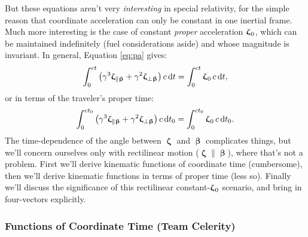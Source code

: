 \documentclass[12pt]{article}
\newcommand{\dd}[1]{\mathrm{d}#1}
\newcommand{\vvbeta}{\bm{\upbeta}}
\newcommand{\vvzeta}{\bm{\upzeta}}
\begin{document}
But these equations aren't very \emph{interesting} in special relativity, for the simple reason that coordinate acceleration can only be constant in one inertial frame. Much more interesting is the case of constant \emph{proper} acceleration $\vvzeta_{\mkern1mu 0}$, which can be maintained indefinitely (fuel considerations aside) and whose magnitude is invariant. In general, Equation \ref{eq:pa} gives:
\begin{equation*}
\int_0^{ct} \left( \gamma^3 \vvzeta_{\parallel \vvbeta} + \gamma^2 \vvzeta_{\perp \vvbeta} \right) c \, \dd t = \int_0^{ct} \vvzeta_{\mkern1mu 0} \, c \, \dd t ,
\end{equation*}
or in terms of the traveler's proper time:
\begin{equation*}
\int_0^{ct_0} \left( \gamma^3 \vvzeta_{\parallel \vvbeta} + \gamma^2 \vvzeta_{\perp \vvbeta} \right) c \, \dd t_0 = \int_0^{ct_0} \vvzeta_{\mkern1mu 0} \, c \, \dd t_0 .
\end{equation*}
The time-dependence of the angle between $\vvzeta$ and $\vvbeta$ complicates things, but we'll concern ourselves only with rectilinear motion ($\vvzeta \parallel \vvbeta$), where that's not a problem. First we'll derive kinematic functions of coordinate time (cumbersome), then we'll derive kinematic functions in terms of proper time (less so). Finally we'll discuss the significance of this rectilinear constant-$\vvzeta_{\mkern1mu 0}$ scenario, and bring in four-vectors explicitly.


\subsubsection{Functions of Coordinate Time (Team Celerity)}
\end{document}
